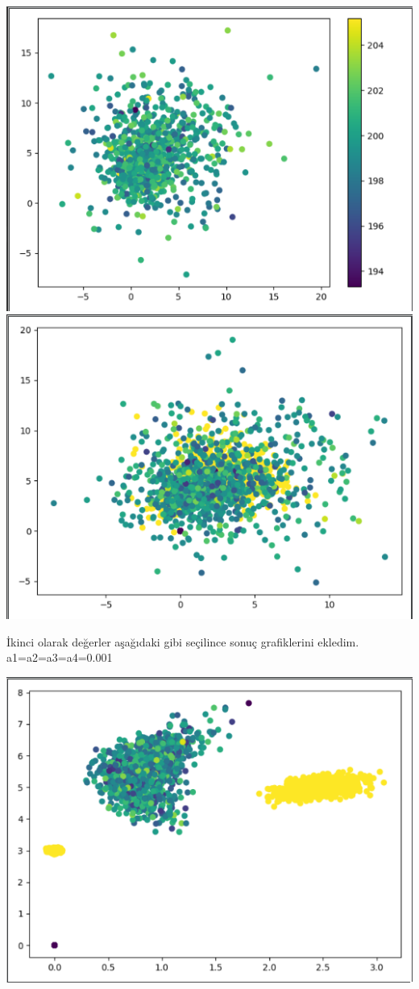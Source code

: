 \documentclass{article}
\begin{document}
\begin{center}
		\includegraphics[scale=0.4]{step3}
		\includegraphics[scale=0.4]{step3.1}
		
	\end{center}
	İkinci olarak değerler aşağıdaki gibi seçilince sonuç grafiklerini ekledim.\\
	a1=a2=a3=a4=0.001
		\begin{center}
		\includegraphics[scale=0.4]{step7}
		
	\end{center}
\end{document}
